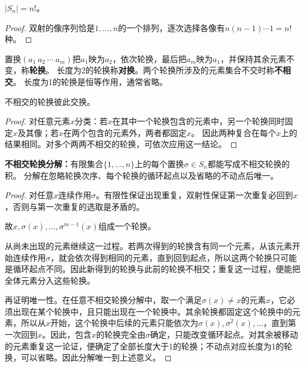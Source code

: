 \begin{proposition}
$|S_n|=n!$。
\end{proposition}
\begin{proof}
双射的像序列恰是$1,\ldots,n$的一个排列，逐次选择各像有$n(n-1)\cdots1=n!$种。
\end{proof}

\begin{definition}
\label{p2:concept:c1-l209}置换$(a_1\ a_2\ \cdots\ a_m)$把$a_1$映为$a_2$，依次轮换，最后把$a_m$映为$a_1$，并保持其余元素不变，称\textbf{轮换}。
\label{p2:concept:c1-l210}长度为2的轮换称\textbf{对换}。两个轮换所涉及的元素集合不交时称\textbf{不相交}。
长度为1的轮换是恒等作用，通常省略。
\end{definition}

\begin{proposition}
不相交的轮换彼此交换。
\end{proposition}
\begin{proof}
对任意元素$x$分类：若$x$在其中一个轮换包含的元素中，另一个轮换同时固定$x$及其像；若$x$在两个包含的元素外，两者都固定$x$。
因此两种复合在每个$x$上的结果相同。对多个两两不相交的轮换，可依次应用这一结论。
\end{proof}

\begin{theorem}
\textbf{不相交轮换分解：}有限集合$\{1,\ldots,n\}$上的每个置换$\sigma\in S_n$都能写成不相交轮换的积。
分解在忽略轮换次序、每个轮换的循环起点以及省略的不动点后唯一。
\end{theorem}
\begin{proof}
对任意$x$连续作用$\sigma$。有限性保证出现重复，双射性保证第一次重复必回到$x$，否则与第一次重复的选取是矛盾的。

故$x,\sigma(x),\ldots,\sigma^{m-1}(x)$组成一个轮换。

从尚未出现的元素继续这一过程。若两次得到的轮换含有同一个元素，从该元素开始连续作用$\sigma$，就会依次得到相同的元素，直到回到起点，所以这两个轮换只可能是循环起点不同。因此新得到的轮换与此前的轮换不相交；重复这一过程，便能把全体元素分入这些轮换。

再证明唯一性。在任意不相交轮换分解中，取一个满足$\sigma(x)\neq x$的元素$x$，它必须出现在某个轮换中，且只能出现在一个轮换中。其余轮换都固定这个轮换中的元素，所以从$x$开始，这个轮换中后续的元素只能依次为$\sigma(x),\sigma^2(x),\ldots$，直到第一次回到$x$。因此，包含$x$的轮换完全由$\sigma$确定，只能改变循环起点。对其余被移动的元素重复这一论证，便确定了全部长度大于1的轮换；不动点对应长度为1的轮换，可以省略。因此分解唯一到上述意义。
\end{proof}

